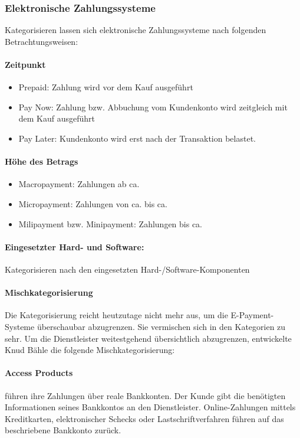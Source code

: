 \subsubsection{Elektronische Zahlungssysteme}
Kategorisieren lassen sich elektronische Zahlungssysteme nach folgenden Betrachtungsweisen:
\paragraph{Zeitpunkt}
\begin{itemize}
     \item Prepaid: Zahlung wird vor dem Kauf ausgeführt
     \item Pay Now: Zahlung bzw. Abbuchung vom Kundenkonto wird zeitgleich mit dem Kauf ausgeführt
     \item Pay Later: Kundenkonto wird erst nach der Transaktion belastet.
\end{itemize}

\paragraph{Höhe des Betrags}
\begin{itemize}
     \item Macropayment: Zahlungen ab ca. 
     \item Micropayment: Zahlungen von ca.  bis ca. 
     \item Milipayment bzw. Minipayment: Zahlungen bis ca. 
\end{itemize}

\paragraph{Eingesetzter Hard- und Software:} Kategorisieren nach den eingesetzten Hard-/Software-Komponenten

\paragraph{Mischkategorisierung}
Die Kategorisierung reicht heutzutage nicht mehr aus, um die E-Payment-Systeme überschaubar abzugrenzen. Sie vermischen sich in den Kategorien zu sehr. Um die Dienstleister weitestgehend über\-sichtlich abzugrenzen, entwickelte Knud Bähle die folgende Mischkategorisierung:
\\

\paragraph{Access Products} führen ihre Zahlungen über reale Bankkonten. Der Kunde gibt die benötigten Informationen seines Bankkontos an den Dienstleister. Online-Zahlungen mittels Kreditkarten, elektronischer Schecks oder Lastschriftverfahren führen auf das beschriebene Bankkonto zurück.

